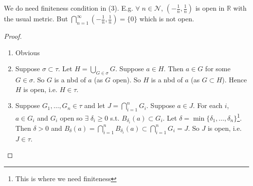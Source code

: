 \begin{remark}
    We do need finiteness condition in (3).
    E.g. $\forall \; n \in \mathcal{N}$, $(-\frac{1}{n}, \frac{1}{n})$ is open in $\mathbb{R}$ with the usual metric.
    But $\bigcap_{n = 1}^\infty (-\frac{1}{n}, \frac{1}{n}) = \{0\}$ which is not open.
\end{remark} 

\begin{proof}
    \begin{enumerate}
        \item Obvious
        \item Suppose $\sigma \subset \tau$.
        Let $H = \bigcup_{G \in \sigma} G$.
        Suppose $a \in H$.
        Then $a \in G$ for some $G \in \sigma$.
        So $G$ is a nbd of $a$ (as $G$ open).
        So $H$ is a nbd of $a$ (as $G \subset H$).
        Hence $H$ is open, i.e. $H \in \tau$.
        \item Suppose $G_1, \dots, G_n \in \tau$ and let $J = \bigcap_{i = 1}^n G_i$.
        Suppose $a \in J$.
        For each $i$, $a \in G_i$ and $G_i$ open so $\exists \; \delta_i \geq 0$ s.t. $B_{\delta_i}(a) \subset G_i$.
        Let $\delta = \min \{\delta_1, \dots, \delta_n\}$\footnote{This is where we need finiteness}.
        Then $\delta > 0$ and $B_\delta(a) = \bigcap_{i = 1}^n B_{\delta_i}(a) \subset \bigcap_{i = 1}^n G_i = J$.
        So $J$ is open, i.e. $J \in \tau$.
    \end{enumerate} 
\end{proof} 
